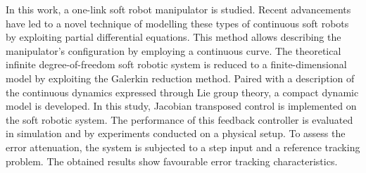 In this work, a one-link soft robot manipulator is studied. Recent advancements have led to a novel technique of modelling these types of continuous soft robots by exploiting partial differential equations. This method allows describing the manipulator's configuration by employing a continuous curve. The theoretical infinite degree-of-freedom soft robotic system is reduced to a finite-dimensional model by exploiting the Galerkin reduction method. Paired with a description of the continuous dynamics expressed through Lie group theory, a compact dynamic model is developed. In this study, Jacobian transposed control is implemented on the soft robotic system. The performance of this feedback controller is evaluated in simulation and by experiments conducted on a physical setup. To assess the error attenuation, the system is subjected to a step input and a reference tracking problem. The obtained results show favourable error tracking characteristics.

